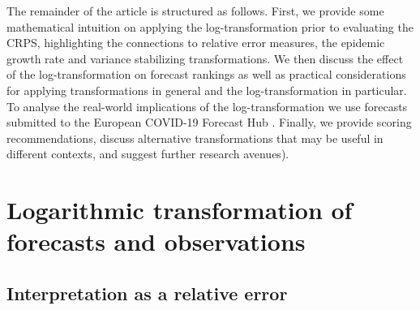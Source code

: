 \documentclass[10pt,letterpaper]{article}
\begin{document}
The remainder of the article is structured as follows. First, we provide some mathematical intuition on applying the log-transformation prior to evaluating the CRPS, highlighting the connections to relative error measures, the epidemic growth rate and variance stabilizing transformations.
We then discuss the effect of the log-transformation on forecast rankings as well as practical considerations for applying transformations in general and the log-transformation in particular. To analyse the real-world implications of the log-transformation we use forecasts submitted to the European COVID-19 Forecast Hub  \cite{europeancovid-19forecasthubEuropeanCovid19Forecast2021,sherrattPredictivePerformanceMultimodel2022}. Finally, we provide scoring recommendations, discuss alternative transformations that may be useful in different contexts, and suggest further research avenues). 


\section*{Logarithmic transformation of forecasts and observations}
\label{sec:methods}

\subsection*{Interpretation as a relative error}
\label{sec:methods:relative}
\end{document}
